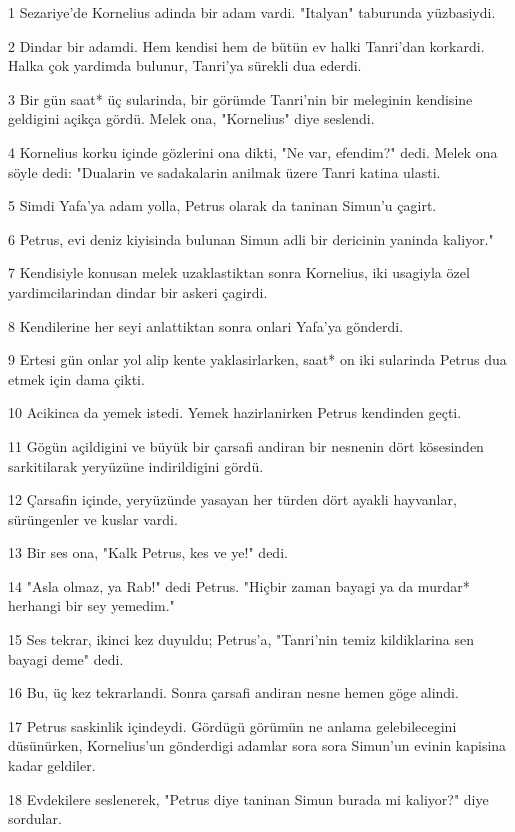 \par 1 Sezariye'de Kornelius adinda bir adam vardi. "Italyan" taburunda yüzbasiydi.
\par 2 Dindar bir adamdi. Hem kendisi hem de bütün ev halki Tanri'dan korkardi. Halka çok yardimda bulunur, Tanri'ya sürekli dua ederdi.
\par 3 Bir gün saat* üç sularinda, bir görümde Tanri'nin bir meleginin kendisine geldigini açikça gördü. Melek ona, "Kornelius" diye seslendi.
\par 4 Kornelius korku içinde gözlerini ona dikti, "Ne var, efendim?" dedi. Melek ona söyle dedi: "Dualarin ve sadakalarin anilmak üzere Tanri katina ulasti.
\par 5 Simdi Yafa'ya adam yolla, Petrus olarak da taninan Simun'u çagirt.
\par 6 Petrus, evi deniz kiyisinda bulunan Simun adli bir dericinin yaninda kaliyor."
\par 7 Kendisiyle konusan melek uzaklastiktan sonra Kornelius, iki usagiyla özel yardimcilarindan dindar bir askeri çagirdi.
\par 8 Kendilerine her seyi anlattiktan sonra onlari Yafa'ya gönderdi.
\par 9 Ertesi gün onlar yol alip kente yaklasirlarken, saat* on iki sularinda Petrus dua etmek için dama çikti.
\par 10 Acikinca da yemek istedi. Yemek hazirlanirken Petrus kendinden geçti.
\par 11 Gögün açildigini ve büyük bir çarsafi andiran bir nesnenin dört kösesinden sarkitilarak yeryüzüne indirildigini gördü.
\par 12 Çarsafin içinde, yeryüzünde yasayan her türden dört ayakli hayvanlar, sürüngenler ve kuslar vardi.
\par 13 Bir ses ona, "Kalk Petrus, kes ve ye!" dedi.
\par 14 "Asla olmaz, ya Rab!" dedi Petrus. "Hiçbir zaman bayagi ya da murdar* herhangi bir sey yemedim."
\par 15 Ses tekrar, ikinci kez duyuldu; Petrus'a, "Tanri'nin temiz kildiklarina sen bayagi deme" dedi.
\par 16 Bu, üç kez tekrarlandi. Sonra çarsafi andiran nesne hemen göge alindi.
\par 17 Petrus saskinlik içindeydi. Gördügü görümün ne anlama gelebilecegini düsünürken, Kornelius'un gönderdigi adamlar sora sora Simun'un evinin kapisina kadar geldiler.
\par 18 Evdekilere seslenerek, "Petrus diye taninan Simun burada mi kaliyor?" diye sordular.
